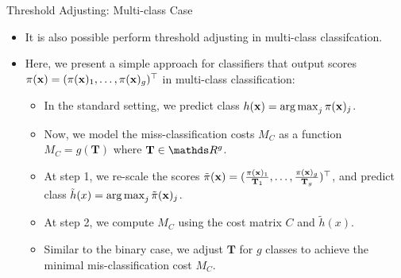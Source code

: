 \documentclass[11pt,compress,t,notes=noshow, xcolor=table]{beamer}
\begin{document}
\begin{vbframe}{Threshold Adjusting: Multi-class Case}
    \footnotesize
    \begin{itemize}
        \footnotesize
        \item It is also possible perform threshold adjusting in multi-class classifcation.
        
        \item Here, we present a simple approach for classifiers that output scores $\pi(\mathbf{x}) = (\pi(\mathbf{x})_1,\ldots,\pi(\mathbf{x})_g)^\top$ in multi-class classification:
        
        \begin{itemize}
            \footnotesize
            \item In the standard setting, we predict class $h(\mathbf{x}) = \operatorname{arg\,max}_{j} \pi(\mathbf{x})_j$.
            \vspace{10pt}
            
            \item Now, we model the miss-classification costs $M_C$ as a function $M_C = g(\mathbf{T})$ where $\mathbf{T} \in \R^{g}$.
            \vspace{10pt}
            
            \item At step 1, we re-scale the scores $\tilde{\pi}(\mathbf{x}) = (\frac{\pi(\mathbf{x})_1}{\mathbf{T}_1},\ldots, \frac{\pi(\mathbf{x})_g}{ \mathbf{T}_g})^\top$, and predict class $\tilde{h}(x) = \operatorname{arg\,max}_j \tilde{\pi}(\mathbf{x})_j$.
            \vspace{10pt}

            \item At step 2, we compute $M_C$ using the cost matrix $C$ and $\tilde{h}(x)$.
            \vspace{10pt}

            \item Similar to the binary case, we adjust $\mathbf{T}$ for $g$ classes to achieve the minimal mis-classification cost $M_C$.
            \vspace{10pt}

        \end{itemize}
    \end{itemize}
\end{vbframe}
\end{document}
